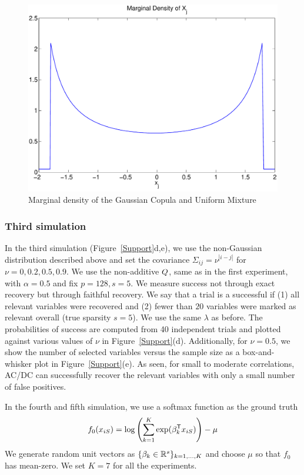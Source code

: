 \begin{figure}
\includegraphics[width=.4\textwidth]{figs/copula_marginal}
\caption{Marginal density of the Gaussian Copula and Uniform Mixture}
\label{fig:copula_marginal}
\end{figure}

\subsubsection{Third simulation}
In the \textrm{third simulation} (Figure~\ref{Support}d,e), we use the non-Gaussian distribution described above and set the covariance $\Sigma_{ij}=\nu^{|i-j|}$ for $\nu = 0, 0.2, 0.5, 0.9$. We use the non-additive $Q$, same as in the first experiment, with $\alpha=0.5$ and fix $p=128, s=5$. We measure success not through exact recovery but through faithful recovery. We say that a trial is a successful if (1) all relevant variables were recovered and (2) fewer than $20$ variables were marked as relevant overall (true sparsity $s=5$). We use the same $\lambda$ as before. The probabilities of success are computed from 40 independent trials and plotted against various values of $\nu$ in Figure~\ref{Support}(d). Additionally, for $\nu = 0.5$, we show the number of selected variables versus the sample size as a box-and-whisker plot in Figure~\ref{Support}(e). As seen, for small to moderate correlations, AC/DC can successfully recover the relevant variables with only a small number of false positives. 

In the fourth and fifth simulation, we use a softmax function as the ground truth
\begin{align}
f_0(x_{iS}) = \log \left( \sum_{k=1}^K \exp( \beta_k^{\mathsf{T}} x_{iS} ) \right) - \mu
\end{align}
We generate random unit vectors as $\{\beta_k \in {\mathbb R}^s\}_{k=1,...,K}$ and choose $\mu$ so that $f_0$ has mean-zero. We set $K = 7$ for all the experiments. 

